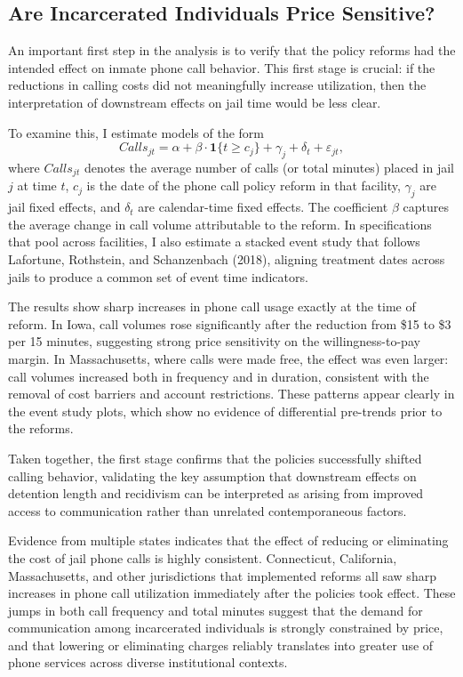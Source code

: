 \documentclass[12pt, a4paper]{article}
\begin{document}
\subsection{Are Incarcerated Individuals Price Sensitive?}

An important first step in the analysis is to verify that the policy reforms had the intended effect on inmate phone call behavior. This first stage is crucial: if the reductions in calling costs did not meaningfully increase utilization, then the interpretation of downstream effects on jail time would be less clear.

To examine this, I estimate models of the form
\[
Calls_{jt} = \alpha + \beta \cdot \mathbf{1}\{t \geq c_j\} + \gamma_j + \delta_t + \varepsilon_{jt},
\]
where $Calls_{jt}$ denotes the average number of calls (or total minutes) placed in jail $j$ at time $t$, $c_j$ is the date of the phone call policy reform in that facility, $\gamma_j$ are jail fixed effects, and $\delta_t$ are calendar-time fixed effects. The coefficient $\beta$ captures the average change in call volume attributable to the reform. In specifications that pool across facilities, I also estimate a stacked event study that follows Lafortune, Rothstein, and Schanzenbach (2018), aligning treatment dates across jails to produce a common set of event time indicators.

The results show sharp increases in phone call usage exactly at the time of reform. In Iowa, call volumes rose significantly after the reduction from \$15 to \$3 per 15 minutes, suggesting strong price sensitivity on the willingness-to-pay margin. In Massachusetts, where calls were made free, the effect was even larger: call volumes increased both in frequency and in duration, consistent with the removal of cost barriers and account restrictions. These patterns appear clearly in the event study plots, which show no evidence of differential pre-trends prior to the reforms.

Taken together, the first stage confirms that the policies successfully shifted calling behavior, validating the key assumption that downstream effects on detention length and recidivism can be interpreted as arising from improved access to communication rather than unrelated contemporaneous factors.

Evidence from multiple states indicates that the effect of reducing or eliminating the cost of jail phone calls is highly consistent. Connecticut, California, Massachusetts, and other jurisdictions that implemented reforms all saw sharp increases in phone call utilization immediately after the policies took effect. These jumps in both call frequency and total minutes suggest that the demand for communication among incarcerated individuals is strongly constrained by price, and that lowering or eliminating charges reliably translates into greater use of phone services across diverse institutional contexts.
\end{document}
